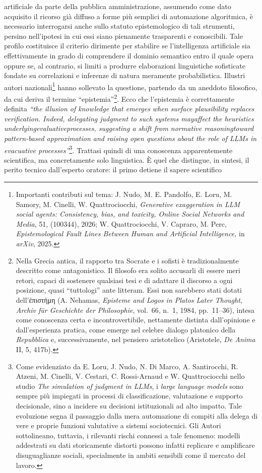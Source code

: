 \documentclass[american,a4paper,]{article}
\begin{document}
artificiale da parte della pubblica amministrazione, assumendo come dato acquisito il ricorso già diffuso a forme più semplici di automazione algoritmica, è necessario interrogarsi anche sullo statuto epistemologico di tali strumenti, persino nell'ipotesi in cui essi siano pienamente trasparenti e conoscibili. Tale profilo costituisce il criterio dirimente per stabilire se l'intelligenza artificiale sia effettivamente in grado di comprendere il dominio semantico entro il quale opera oppure se, al contrario, si limiti a produrre elaborazioni linguistiche sofisticate fondate su correlazioni e inferenze di natura meramente probabilistica. Illustri autori nazionali\footnote{Importanti contributi sul tema: J. Nudo, M. E. Pandolfo, E. Loru, M. Samory, M. Cinelli, W. Quattrociocchi, \emph{Generative exaggeration in LLM social agents: Consistency, bias, and toxicity, Online Social Networks and Media}, 51, (100344), 2026; W. Quattrociocchi, V. Capraro, M. Perc, \emph{Epistemological Fault Lines Between Human and Artificial Intelligence,} in \emph{arXiv}, 2025.} hanno sollevato la questione, partendo da un aneddoto filosofico, da cui deriva il termine ``epistemia''\footnote{Nella Grecia antica, il rapporto tra Socrate e i sofisti è tradizionalmente descritto come antagonistico. Il filosofo era solito accusarli di essere meri retori, capaci di sostenere qualsiasi tesi e di adattare il discorso a ogni posizione, quasi ``tuttologi'' ante litteram. Essi non sarebbero stati dotati dell'ἐπιστήμη (A. Nehamas, \emph{Episteme and Logos in Plato\textquotesingle s Later Thought}, \emph{Archiv für Geschichte der Philosophie}, vol.~66, n.~1, 1984, pp.~11--36), intesa come conoscenza certa e incontrovertibile, nettamente distinta dall'opinione e dall'esperienza pratica, come emerge nel celebre dialogo platonico della \emph{Repubblica} e, successivamente, nel pensiero aristotelico (Aristotele, \emph{De Anima} II, 5, 417b).}. Ecco che l'epistemia è correttamente definita \emph{``the illusion of knowledge that emerges when surface plausibility replaces verification. Indeed, delegating judgment to such systems mayaffect the heuristics underlyingevaluativeprocesses, suggesting a shift from normative reasoningtoward pattern-based approximation and raising open questions about the role of LLMs in evacuative processes''}\footnote{Come evidenziato da E. Loru, J. Nudo, N. Di Marco, A. Santirocchi, R. Atzeni, M. Cinelli, V. Cestari, C. Rossi-Arnaud e W. Quattrociocchi nello studio \emph{The simulation of judgment in LLMs}, i \emph{large language models} sono sempre più impiegati in processi di classificazione, valutazione e supporto decisionale, sino a incidere su decisioni istituzionali ad alto impatto. Tale evoluzione segna il passaggio dalla mera automazione di compiti alla delega di vere e proprie funzioni valutative a sistemi sociotecnici. Gli Autori sottolineano, tuttavia, i rilevanti rischi connessi a tale fenomeno: modelli addestrati su dati storicamente distorti possono infatti replicare e amplificare disuguaglianze sociali, specialmente in ambiti sensibili come il mercato del lavoro.}\emph{.} Trattasi quindi di una conoscenza apparentemente scientifica, ma concretamente solo linguistica. È quel che distingue, in sintesi, il perito tecnico dall'esperto oratore: il primo detiene il sapere scientifico 
\end{document}
